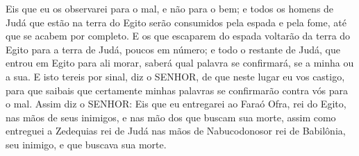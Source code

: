 {Eis que eu os observarei para o mal, e não para o bem; e todos os homens de Judá que estão na terra do Egito serão consumidos pela espada e pela fome, até que se acabem por completo.
E os que escaparem do espada voltarão da terra do Egito para a terra de Judá, poucos em número; e todo o restante de Judá, que entrou em Egito para ali morar, saberá qual palavra se confirmará, se a minha ou a sua.
E isto tereis por sinal, diz o SENHOR, de que neste lugar eu vos castigo, para que saibais que certamente minhas palavras se confirmarão contra vós para o mal.
Assim diz o SENHOR: Eis que eu entregarei ao Faraó Ofra, rei do Egito, nas mãos de seus inimigos, e nas mão dos que buscam sua morte,
 assim como entreguei a Zedequias rei de Judá nas mãos de Nabucodonosor rei de Babilônia, seu inimigo, e que buscava sua morte.

\par }


